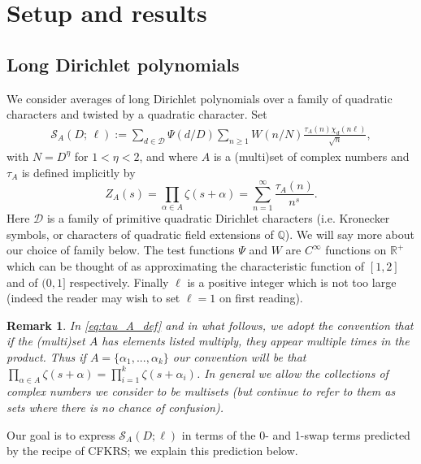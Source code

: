 \documentclass[12pt]{amsart}
\newtheorem{remark}{Remark}
\begin{document}
	
	
	\section{Setup and results}
	\label{sec:setup}
	
	\subsection{Long Dirichlet polynomials}
	\label{sec:long_dirichlet}
	
	We consider averages of long Dirichlet polynomials over a family of quadratic characters and twisted by a quadratic character. Set
	\begin{eqnarray*}
		\mathcal{S}_A(D;\, \ell):= \sum_{d\in\mathcal D}\Psi(d/D)\sum_{n\geq 1}W(n/N)  \frac{\tau_A(n) \chi_d(n\ell)}{\sqrt{n}},
	\end{eqnarray*}
	with $N = D^\eta$ for $1 < \eta < 2$,
	and where $A$ is a (multi)set of complex numbers and $\tau_A$ is defined implicitly by 
	\begin{equation}
		\label{eq:tau_A_def}
		Z_A(s)=\prod_{\alpha \in A} \zeta(s+\alpha) =\sum_{n=1}^\infty \frac{\tau_A(n)}{n^s}.
	\end{equation}
	Here $\mathcal D$ is a family of primitive quadratic Dirichlet characters (i.e. Kronecker symbols, or characters of quadratic field extensions of $\mathbb Q$). We will say more about our choice of family below.
	The test functions $\Psi$ and $W$  are $C^\infty$ functions on $\mathbb R^+$ which can be thought of as approximating the characteristic function of $[1,2]$ and of $(0,1]$ respectively. Finally $\ell$ is a positive integer which is not too large (indeed the reader may wish to set $\ell = 1$ on first reading).
	
	\begin{remark}
	In \eqref{eq:tau_A_def} and in what follows, we adopt the convention that if the (multi)set $A$ has elements listed multiply, they appear multiple times in the product. Thus if $A = \{\alpha_1,...,\alpha_k\}$ our convention will be that $\prod_{\alpha \in A} \zeta(s+\alpha) = \prod_{i=1}^k \zeta(s+\alpha_i)$. In general we allow the collections of complex numbers we consider to be multisets (but continue to refer to them as sets where there is no chance of confusion).
	\end{remark}
	
	
	Our goal is to express $\mathcal S_A(D;\ell)$  in terms of the 0- and 1-swap terms predicted by the recipe of CFKRS; we explain this prediction below.
	
\end{document}
